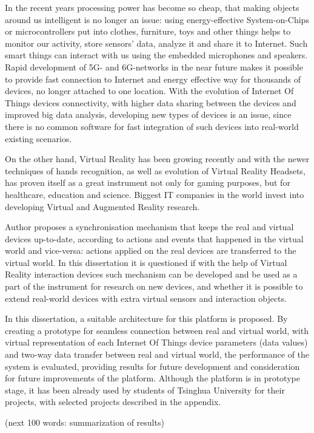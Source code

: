 \begin{abstract*}

  In the recent years processing power has become so cheap, that making objects around us intelligent is no longer an issue: using energy-effective System-on-Chips or microcontrollers put into clothes, furniture, toys and other things helps to monitor our activity, store sensors' data, analyze it and share it to Internet. Such smart things can interact with us using the embedded microphones and speakers. Rapid development of 5G- and 6G-networks in the near future makes it possible to provide fast connection to Internet and energy effective way for thousands of devices, no longer attached to one location. With the evolution of Internet Of Things devices connectivity, with higher data sharing between the devices and improved big data analysis, developing new types of devices is an issue, since there is no common software for fast integration of such devices into real-world existing scenarios.
   
  On the other hand, Virtual Reality has been growing recently and with the newer techniques of hands recognition, as well as evolution of Virtual Reality Headsets, has proven itself as a great instrument not only for gaming purposes, but for healthcare, education and science. Biggest IT companies in the world invest into developing Virtual and Augmented Reality research.
   
  Author proposes a synchronisation mechanism that keeps the real and virtual devices up-to-date, according to actions and events that happened in the virtual world and vice-versa: actions applied on the real devices are transferred to the virtual world. In this dissertation it is questioned if with the help of Virtual Reality interaction devices such mechanism can be developed and be used as a part of the instrument for research on new devices, and whether it is possible to extend real-world devices with extra virtual sensors and interaction objects.
  
  In this dissertation, a suitable architecture for this platform is proposed. By creating a prototype for seamless connection between real and virtual world, with virtual representation of each Internet Of Things device parameters (data values) and two-way data transfer between real and virtual world, the performance of the system is evaluated, providing results for future development and consideration for future improvements of the platform. Although the platform is in prototype stage, it has been already used by students of Tsinghua University for their projects, with selected projects described in the appendix. 
  
  (next 100 words: summarization of results)
 


\end{abstract*}
